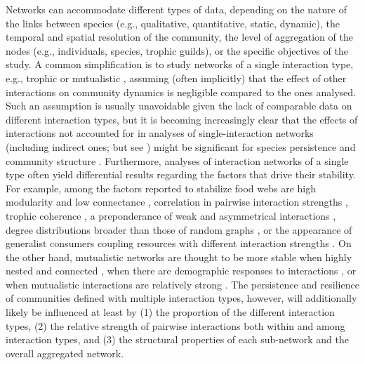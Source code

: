 Networks can accommodate different types of data, depending on the nature of the links between species (e.g., qualitative, quantitative, static, dynamic), the temporal and spatial resolution of the community, the level of aggregation of the nodes (e.g., individuals, species, trophic guilds), or the specific objectives of the study. A common simplification is to study networks of a single interaction type, e.g., trophic \citep{McCann2011} or mutualistic \citep{Bascompte2013}, assuming (often implicitly) that the effect of other interactions on community dynamics is negligible compared to the ones analysed. Such an assumption is usually unavoidable given the lack of comparable data on different interaction types, but it is becoming increasingly clear that the effects of interactions not accounted for in analyses of single-interaction networks (including indirect ones; but see \citealt{Cazelles2016}) might be significant for species persistence \citep{Soliveres2015a, Kefi2016a} and community structure \citep{Sander2015, Golubski2016}. Furthermore, analyses of interaction networks of a single type often yield differential results regarding the factors that drive their stability. For example, among the factors reported to stabilize food webs are high modularity and low connectance \citep{Thebault2010}, correlation in pairwise interaction strengths \citep{Tang2014}, trophic coherence \citep{Johnson2014}, a preponderance of weak \citep{McCann1998} and asymmetrical interactions \citep{Bascompte2006}, degree distributions broader than those of random graphs \citep{Allesina2015}, or the appearance of generalist consumers coupling resources with different interaction strengths \citep{Rip2010}. On the other hand, mutualistic networks are thought to be more stable when highly nested and connected \citep{Thebault2010, Lever2014}, when there are demographic responses to interactions \citep{Lee2015}, or when mutualistic interactions are relatively strong \citep{Rohr2014}. The persistence and resilience of communities defined with multiple interaction types, however, will additionally likely be influenced at least by (1) the proportion of the different interaction types, (2) the relative strength of pairwise interactions both within and among interaction types, and (3) the structural properties of each sub-network and the overall aggregated network.

